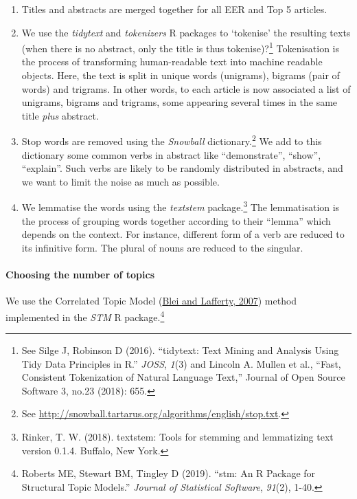 \documentclass[
  12pt,
  onecolumn]{article}
\providecommand{\tightlist}{%
  \setlength{\itemsep}{0pt}\setlength{\parskip}{0pt}}
\begin{document}
\begin{enumerate}
\def\labelenumi{\arabic{enumi}.}
\tightlist
\item
  Titles and abstracts are merged together for all EER and Top 5 articles.
\item
  We use the \emph{tidytext} and \emph{tokenizers} R packages to `tokenise' the resulting texts (when there is no abstract, only the title is thus tokenise)?\footnote{See Silge J, Robinson D (2016). ``tidytext: Text Mining and Analysis Using Tidy Data Principles in R.'' \emph{JOSS}, \emph{1}(3) and Lincoln A. Mullen et al., ``Fast, Consistent Tokenization of Natural Language Text,'' Journal of Open Source Software 3, no.23 (2018): 655.} Tokenisation is the process of transforming human-readable text into machine readable objects. Here, the text is split in unique words (unigrams), bigrams (pair of words) and trigrams. In other words, to each article is now associated a list of unigrams, bigrams and trigrams, some appearing several times in the same title \emph{plus} abstract.
\item
  Stop words are removed using the \emph{Snowball} dictionary.\footnote{See \url{http://snowball.tartarus.org/algorithms/english/stop.txt}.} We add to this dictionary some common verbs in abstract like ``demonstrate'', ``show'', ``explain''. Such verbs are likely to be randomly distributed in abstracts, and we want to limit the noise as much as possible.
\item
  We lemmatise the words using the \emph{textstem} package.\footnote{Rinker, T. W. (2018). textstem: Tools for stemming and lemmatizing text version 0.1.4. Buffalo, New York.} The lemmatisation is the process of grouping words together according to their ``lemma'' which depends on the context. For instance, different form of a verb are reduced to its infinitive form. The plural of nouns are reduced to the singular.
\end{enumerate}

\hypertarget{choosing-the-number-of-topics}{%
\paragraph*{Choosing the number of topics}\label{choosing-the-number-of-topics}}

We use the Correlated Topic Model (\protect\hyperlink{ref-blei2007}{Blei and Lafferty, 2007}) method implemented in the \emph{STM} R package.\footnote{Roberts ME, Stewart BM, Tingley D (2019). ``stm: An R Package for Structural Topic Models.'' \emph{Journal of Statistical Software}, \emph{91}(2), 1-40.}
\end{document}
